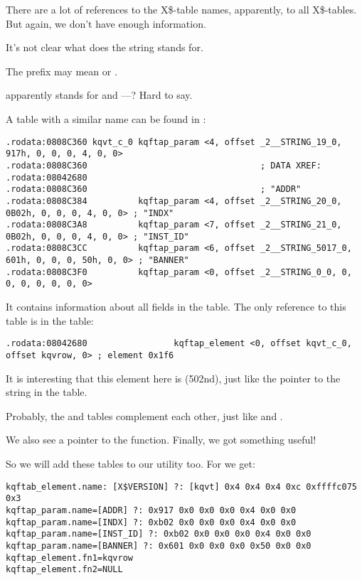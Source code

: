 There are a lot of references to the X\$-table names, apparently, to all  X\$-tables.
But again, we don't have enough information.

It's not clear what does the  string stands for. 

The  prefix may mean  or . 

 apparently stands for  and ---? 
Hard to say.

A table with a similar name can be found in :

\begin{lstlisting}[caption=kqf.o]
.rodata:0808C360 kqvt_c_0 kqftap_param <4, offset _2__STRING_19_0, 917h, 0, 0, 0, 4, 0, 0>
.rodata:0808C360                                  ; DATA XREF: .rodata:08042680
.rodata:0808C360                                  ; "ADDR"
.rodata:0808C384          kqftap_param <4, offset _2__STRING_20_0, 0B02h, 0, 0, 0, 4, 0, 0> ; "INDX"
.rodata:0808C3A8          kqftap_param <7, offset _2__STRING_21_0, 0B02h, 0, 0, 0, 4, 0, 0> ; "INST_ID"
.rodata:0808C3CC          kqftap_param <6, offset _2__STRING_5017_0, 601h, 0, 0, 0, 50h, 0, 0> ; "BANNER"
.rodata:0808C3F0          kqftap_param <0, offset _2__STRING_0_0, 0, 0, 0, 0, 0, 0, 0>
\end{lstlisting}

It contains information about all fields in the  table.
The only reference to this table is in the  table:

\begin{lstlisting}[caption=kqf.o]
.rodata:08042680                 kqftap_element <0, offset kqvt_c_0, offset kqvrow, 0> ; element 0x1f6
\end{lstlisting}

It is interesting that this element here is  (502nd), just like the pointer to the  string in 
the  table.

Probably, the  and  tables complement each other, just like  and .

We also see a pointer to the  function. Finally, we got something useful!

So we will add these tables to our \oracletables utility too. For  we get:

\begin{lstlisting}[caption=Result of \OracleTablesName]
kqftab_element.name: [X$VERSION] ?: [kqvt] 0x4 0x4 0x4 0xc 0xffffc075 0x3
kqftap_param.name=[ADDR] ?: 0x917 0x0 0x0 0x0 0x4 0x0 0x0
kqftap_param.name=[INDX] ?: 0xb02 0x0 0x0 0x0 0x4 0x0 0x0
kqftap_param.name=[INST_ID] ?: 0xb02 0x0 0x0 0x0 0x4 0x0 0x0
kqftap_param.name=[BANNER] ?: 0x601 0x0 0x0 0x0 0x50 0x0 0x0
kqftap_element.fn1=kqvrow
kqftap_element.fn2=NULL
\end{lstlisting}

